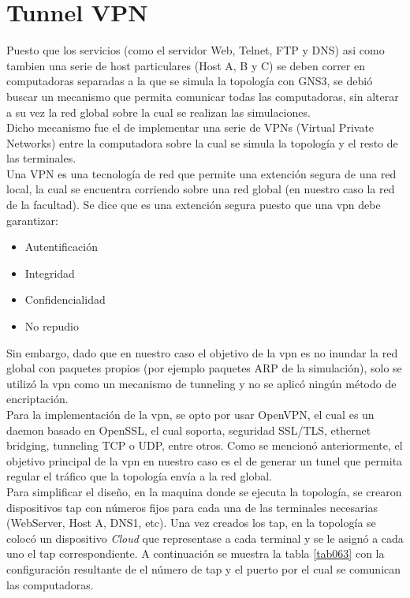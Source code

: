 \section{Tunnel VPN}

Puesto que los servicios (como el servidor Web, Telnet, FTP y DNS) asi como tambien una serie de 
host particulares (Host A, B y C) se deben correr en computadoras separadas a la que se simula 
la topología con GNS3, se debió buscar un mecanismo que permita comunicar todas las computadoras,
sin alterar a su vez la red global sobre la cual se realizan las simulaciones.\\
Dicho mecanismo fue el de implementar una serie de VPNs (Virtual Private Networks) entre la 
computadora sobre la cual se simula la topología y el resto de las terminales.\\
Una VPN es una tecnología de red que permite una extención segura de una red local, la cual se 
encuentra corriendo sobre una red global (en nuestro caso la red de la facultad). Se dice que es 
una extención segura puesto que una vpn debe garantizar:\\

\begin{itemize}
	\item Autentificación
	\item Integridad
	\item Confidencialidad
	\item No repudio
\end{itemize} 

Sin embargo, dado que en nuestro caso el objetivo de la vpn es no inundar la red global con
paquetes propios (por ejemplo paquetes ARP de la simulación), solo se utilizó la vpn 
como un mecanismo de tunneling y no se aplicó ningún método de encriptación.\\

Para la implementación de la vpn, se opto por usar OpenVPN, el cual es un daemon basado en 
OpenSSL, el cual soporta, seguridad SSL/TLS, ethernet bridging, tunneling TCP o UDP, entre
otros. Como se mencionó anteriormente, el objetivo principal de la vpn en nuestro caso es el de
generar un tunel que permita regular el tráfico que la topología envía a la red global.\\
Para simplificar el diseño, en la maquina donde se ejecuta la topología, se crearon 
dispositivos tap con números fijos para cada una de las terminales necesarias (WebServer, Host A, 
DNS1, etc). Una vez creados los tap, en la topología se colocó un dispositivo \textit{Cloud} que 
representase a cada terminal y se le asignó a cada uno el tap correspondiente. A continuación se 
muestra la tabla \ref{tab063} con la configuración resultante de el número de tap y el puerto 
por el cual se comunican las computadoras.

